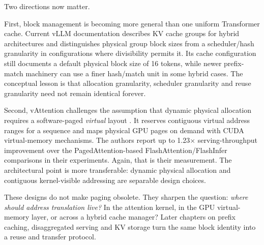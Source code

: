 
Two directions now matter.

First, block management is becoming more general than one uniform
Transformer cache. Current vLLM documentation describes KV cache groups for
hybrid architectures and distinguishes physical group block sizes from a
scheduler/hash granularity in configurations where divisibility permits it.
Its cache configuration still documents a default physical block size of 16
tokens, while newer prefix-match machinery can use a finer hash/match unit in
some hybrid cases. The conceptual lesson is that allocation granularity,
scheduler granularity and reuse granularity need not remain identical forever.

Second, vAttention challenges the assumption that dynamic physical allocation
requires a software-paged \emph{virtual} layout
\cite{prabhu2025vattention}. It reserves contiguous virtual address ranges for
a sequence and maps physical GPU pages on demand with CUDA virtual-memory
mechanisms. The authors report up to 1.23$\times$ serving-throughput
improvement over the PagedAttention-based FlashAttention/FlashInfer
comparisons in their experiments. Again, that is their measurement. The
architectural point is more transferable: dynamic physical allocation and
contiguous kernel-visible addressing are separable design choices.

These designs do not make paging obsolete. They sharpen the question:
\emph{where should address translation live?} In the attention kernel, in the
GPU virtual-memory layer, or across a hybrid cache manager? Later chapters on
prefix caching, disaggregated serving and KV storage turn the same block
identity into a reuse and transfer protocol.

\ExercisesSection

